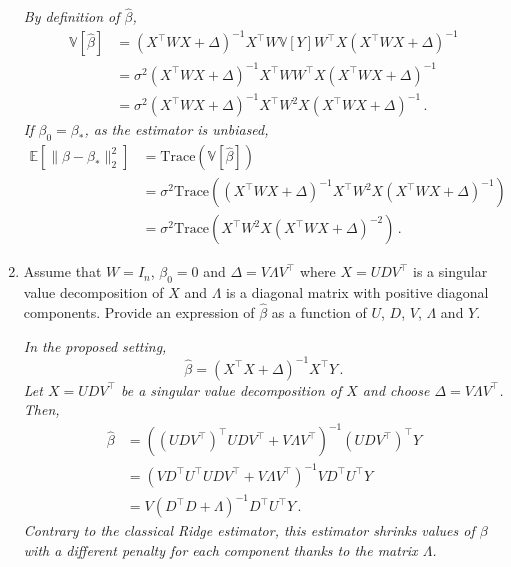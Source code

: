 \documentclass[a4paper,10pt,fleqn]{article}
\newcommand{\eqsp}{\,}
\newcommand{\1}{\ensuremath{\mathbbm{1}}}
\begin{document}
\begin{enumerate}
{\em
By definition of $\widehat \beta$,
\begin{align*}
\mathbb{V}[\widehat \beta] &= \left(X^\top W X + \Delta\right)^{-1}X^\top W \mathbb{V}[Y] W^\top X\left(X^\top W X + \Delta\right)^{-1}\\
&= \sigma^2\left(X^\top W X + \Delta\right)^{-1}X^\top W W^\top X\left(X^\top W X + \Delta\right)^{-1}\\
&= \sigma^2\left(X^\top W X + \Delta\right)^{-1}X^\top W^2 X\left(X^\top W X + \Delta\right)^{-1}\eqsp.
\end{align*}
If  $\beta_0 = \beta_*$, as the estimator is unbiased,
\begin{align*}
\mathbb{E}[\|\widehat \beta-\beta_*\|_2^2] &= \mathrm{Trace}\left(\mathbb{V}[\widehat \beta] \right)\\
&=\sigma^2\mathrm{Trace}\left(\left(X^\top W X + \Delta\right)^{-1}X^\top W^2 X\left(X^\top W X + \Delta\right)^{-1}\right)\\
&=\sigma^2\mathrm{Trace}\left(X^\top W^2 X\left(X^\top W X + \Delta\right)^{-2}\right)\eqsp.
\end{align*}
}
\item Assume that $W=I_n$, $\beta_0=0$ and $\Delta = V\Lambda 
 V^\top$ where $X = U D V^\top$ is a singular value decomposition of $X$ and $\Lambda$ is a diagonal matrix with positive diagonal components. Provide an expression of $\widehat \beta$ as a function of $U$, $D$, $V$, $\Lambda$ and $Y$.
\vspace{.2cm}

{\em
In the proposed setting,
$$
\widehat{\beta} = \left(X^\top X + \Delta\right)^{-1}X^\top Y\eqsp.
$$
Let $X = U D V^\top$ be a singular value decomposition of $X$ and choose $\Delta = V\Lambda 
 V^\top$. Then,
\begin{align*}
\widehat{\beta} &= \left((U D V^\top)^\top U D V^\top + V\Lambda V^\top\right)^{-1}(U D V^\top)^\top Y\\
&=  \left(V D^\top U^\top U D V^\top + V\Lambda V^\top\right)^{-1}V D^\top U^\top Y\\
&=  V\left(D^\top D + \Lambda \right)^{-1}D^\top U^\top Y\eqsp.
\end{align*}
Contrary to the classical Ridge estimator, this estimator shrinks values of $\beta$ with a different penalty for each component thanks to the matrix $\Lambda$.
}
\end{enumerate}
\end{document}
